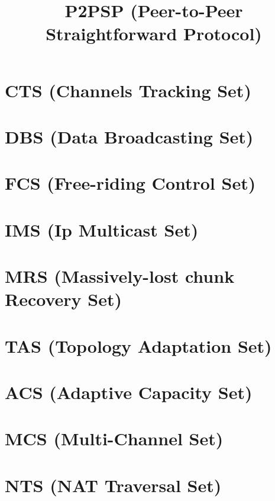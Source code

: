 \newcommand{\note}[1]{\color{red}\textbf{#1}}

\title{P2PSP (Peer-to-Peer Straightforward Protocol)}
\maketitle
\tableofcontents

\begin{abstract}

\end{abstract}

\section{CTS (Channels Tracking Set)}


\section{DBS (Data Broadcasting Set)}


\section{FCS (Free-riding Control Set)}


\section{IMS (Ip Multicast Set)}


\section{MRS (Massively-lost chunk Recovery Set)}


\section{TAS (Topology Adaptation Set)}


\section{ACS (Adaptive Capacity Set)}


\section{MCS (Multi-Channel Set)}


\section{NTS (NAT Traversal Set)}



